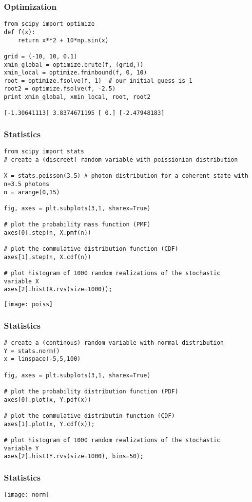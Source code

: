 \begin{frame}[fragile]\frametitle{Optimization}
\begin{lstlisting}
from scipy import optimize
def f(x):
    return x**2 + 10*np.sin(x)
    
grid = (-10, 10, 0.1)
xmin_global = optimize.brute(f, (grid,))
xmin_local = optimize.fminbound(f, 0, 10)
root = optimize.fsolve(f, 1)  # our initial guess is 1
root2 = optimize.fsolve(f, -2.5)
print xmin_global, xmin_local, root, root2

[-1.30641113] 3.8374671195 [ 0.] [-2.47948183]
\end{lstlisting}
\end{frame}


\begin{frame}[fragile]\frametitle{Statistics}
\begin{lstlisting}
from scipy import stats
# create a (discreet) random variable with poissionian distribution

X = stats.poisson(3.5) # photon distribution for a coherent state with n=3.5 photons
n = arange(0,15)

fig, axes = plt.subplots(3,1, sharex=True)

# plot the probability mass function (PMF)
axes[0].step(n, X.pmf(n))

# plot the commulative distribution function (CDF)
axes[1].step(n, X.cdf(n))

# plot histogram of 1000 random realizations of the stochastic variable X
axes[2].hist(X.rvs(size=1000));
\end{lstlisting}
\begin{center}
\texttt{[image: poiss]}
\end{center}
\end{frame}


\begin{frame}[fragile]\frametitle{Statistics}
\begin{lstlisting}
# create a (continous) random variable with normal distribution
Y = stats.norm()
x = linspace(-5,5,100)

fig, axes = plt.subplots(3,1, sharex=True)

# plot the probability distribution function (PDF)
axes[0].plot(x, Y.pdf(x))

# plot the commulative distributin function (CDF)
axes[1].plot(x, Y.cdf(x));

# plot histogram of 1000 random realizations of the stochastic variable Y
axes[2].hist(Y.rvs(size=1000), bins=50);
\end{lstlisting}

\end{frame}

\begin{frame}[fragile]\frametitle{Statistics}
\begin{center}
\texttt{[image: norm]}
\end{center}
\end{frame}




